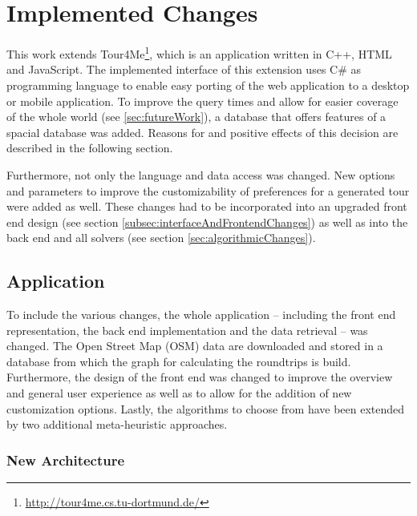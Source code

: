 \chapter{Implemented Changes}
\label{chapter:implementedChanges}

This work extends Tour4Me\footnote{\url{http://tour4me.cs.tu-dortmund.de/}}, which is an application written in C++, HTML and JavaScript. 
The implemented interface of this extension uses C\# as programming language to enable easy porting of the web application to a desktop or mobile application.
To improve the query times and allow for easier coverage of the whole world (see \ref{sec:futureWork}), a database that offers features of a spacial database was added. 
Reasons for and positive effects of this decision are described in the following section.

Furthermore, not only the language and data access was changed.
New options and parameters to improve the customizability of preferences for a generated tour were added as well.
These changes had to be incorporated into an upgraded front end design (see section \ref{subsec:interfaceAndFrontendChanges}) as well as into the back end and all solvers (see section \ref{sec:algorithmicChanges}). 


\section{Application}
\label{sec:application}

To include the various changes, the whole application -- including the front end representation, the back end implementation and the data retrieval -- was changed.
The Open Street Map (OSM) data are downloaded and stored in a database from which the graph for calculating the roundtrips is build.
Furthermore, the design of the front end was changed to improve the overview and general user experience as well as to allow for the addition of new customization options.
Lastly, the algorithms to choose from have been extended by two additional meta-heuristic approaches.

\subsection{New Architecture}
\label{sec:newArchitecture}


